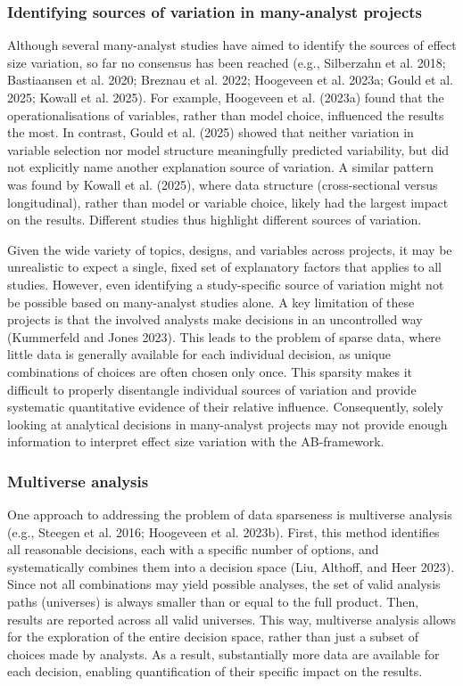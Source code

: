 \documentclass[
  letterpaper,
  DIV=11,
  numbers=noendperiod]{scrartcl}
\begin{document}
\subsubsection{Identifying sources of variation in many-analyst
projects}\label{identifying-sources-of-variation-in-many-analyst-projects}

Although several many-analyst studies have aimed to identify the sources
of effect size variation, so far no consensus has been reached (e.g.,
Silberzahn et al. 2018; Bastiaansen et al. 2020; Breznau et al. 2022;
Hoogeveen et al. 2023a; Gould et al. 2025; Kowall et al. 2025). For
example, Hoogeveen et al. (2023a) found that the operationalisations of
variables, rather than model choice, influenced the results the most. In
contrast, Gould et al. (2025) showed that neither variation in variable
selection nor model structure meaningfully predicted variability, but
did not explicitly name another explanation source of variation. A
similar pattern was found by Kowall et al. (2025), where data structure
(cross-sectional versus longitudinal), rather than model or variable
choice, likely had the largest impact on the results. Different studies
thus highlight different sources of variation.

Given the wide variety of topics, designs, and variables across
projects, it may be unrealistic to expect a single, fixed set of
explanatory factors that applies to all studies. However, even
identifying a study-specific source of variation might not be possible
based on many-analyst studies alone. A key limitation of these projects
is that the involved analysts make decisions in an uncontrolled way
(Kummerfeld and Jones 2023). This leads to the problem of sparse data,
where little data is generally available for each individual decision,
as unique combinations of choices are often chosen only once. This
sparsity makes it difficult to properly disentangle individual sources
of variation and provide systematic quantitative evidence of their
relative influence. Consequently, solely looking at analytical decisions
in many-analyst projects may not provide enough information to interpret
effect size variation with the AB-framework.

\subsubsection{Multiverse analysis}\label{multiverse-analysis}

One approach to addressing the problem of data sparseness is multiverse
analysis (e.g., Steegen et al. 2016; Hoogeveen et al. 2023b). First,
this method identifies all reasonable decisions, each with a specific
number of options, and systematically combines them into a decision
space (Liu, Althoff, and Heer 2023). Since not all combinations may
yield possible analyses, the set of valid analysis paths (universes) is
always smaller than or equal to the full product. Then, results are
reported across all valid universes. This way, multiverse analysis
allows for the exploration of the entire decision space, rather than
just a subset of choices made by analysts. As a result, substantially
more data are available for each decision, enabling quantification of
their specific impact on the results.
\end{document}
